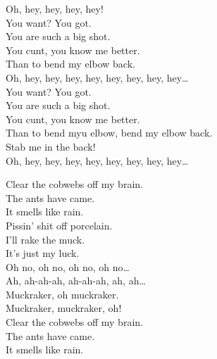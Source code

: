 
\label{album:12-bar-bruise}




Oh, hey, hey, hey, hey! \\

You want? You got. \\
You are such a big shot. \\
You cunt, you know me better. \\
Than to bend my elbow back. \\

Oh, hey, hey, hey, hey, hey, hey, hey, hey… \\

You want? You got. \\
You are such a big shot. \\
You cunt, you know me better. \\
Than to bend myu elbow, bend my elbow back. \\
Stab me in the back! \\

Oh, hey, hey, hey, hey, hey, hey, hey, hey… \\




Clear the cobwebs off my brain. \\
The ants have came. \\
It smells like rain. \\

Pissin' shit off porcelain. \\
I'll rake the muck. \\
It's just my luck. \\

Oh no, oh no, oh no, oh no… \\

Ah, ah-ah-ah, ah-ah-ah, ah, ah… \\
Muckraker, oh muckraker. \\
Muckraker, muckraker, oh! \\

Clear the cobwebs off my brain. \\
The ants have came. \\
It smells like rain. \\

